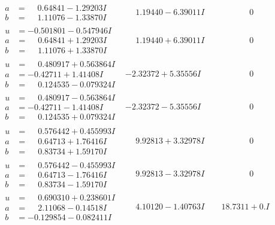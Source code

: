 \documentclass[1p]{elsarticle_modified}
\theoremstyle{definition}
\begin{document}
$$\begin{array}{c|c|c}
\begin{aligned}
a &= \phantom{-}0.64841 - 1.29203 I \\
b &= \phantom{-}1.11076 - 1.33870 I\end{aligned}
 & \phantom{-}1.19440 - 6.39011 I & \phantom{-0.000000 } 0 \\ \hline\begin{aligned}
u &= -0.501801 - 0.547946 I \\
a &= \phantom{-}0.64841 + 1.29203 I \\
b &= \phantom{-}1.11076 + 1.33870 I\end{aligned}
 & \phantom{-}1.19440 + 6.39011 I & \phantom{-0.000000 } 0 \\ \hline\begin{aligned}
u &= \phantom{-}0.480917 + 0.563864 I \\
a &= -0.42711 + 1.41408 I \\
b &= \phantom{-}0.124535 - 0.079324 I\end{aligned}
 & -2.32372 + 5.35556 I & \phantom{-0.000000 } 0 \\ \hline\begin{aligned}
u &= \phantom{-}0.480917 - 0.563864 I \\
a &= -0.42711 - 1.41408 I \\
b &= \phantom{-}0.124535 + 0.079324 I\end{aligned}
 & -2.32372 - 5.35556 I & \phantom{-0.000000 } 0 \\ \hline\begin{aligned}
u &= \phantom{-}0.576442 + 0.455993 I \\
a &= \phantom{-}0.64713 + 1.76416 I \\
b &= \phantom{-}0.83734 + 1.59170 I\end{aligned}
 & \phantom{-}9.92813 + 3.32978 I & \phantom{-0.000000 } 0 \\ \hline\begin{aligned}
u &= \phantom{-}0.576442 - 0.455993 I \\
a &= \phantom{-}0.64713 - 1.76416 I \\
b &= \phantom{-}0.83734 - 1.59170 I\end{aligned}
 & \phantom{-}9.92813 - 3.32978 I & \phantom{-0.000000 } 0 \\ \hline\begin{aligned}
u &= \phantom{-}0.690310 + 0.238601 I \\
a &= \phantom{-}2.11068 - 0.14518 I \\
b &= -0.129854 - 0.082411 I\end{aligned}
 & \phantom{-}4.10120 - 1.40763 I & \phantom{-}18.7311 + 0. I\phantom{ +0.000000I}\\

\end{array}$$
\end{document}
